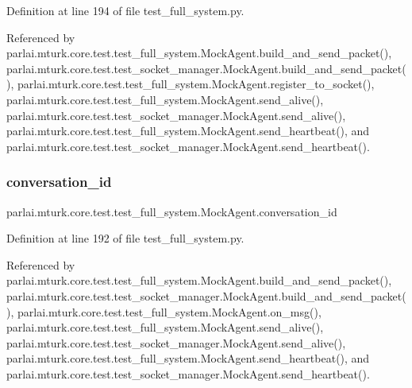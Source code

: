 Definition at line 194 of file test\+\_\+full\+\_\+system.\+py.



Referenced by parlai.\+mturk.\+core.\+test.\+test\+\_\+full\+\_\+system.\+Mock\+Agent.\+build\+\_\+and\+\_\+send\+\_\+packet(), parlai.\+mturk.\+core.\+test.\+test\+\_\+socket\+\_\+manager.\+Mock\+Agent.\+build\+\_\+and\+\_\+send\+\_\+packet(), parlai.\+mturk.\+core.\+test.\+test\+\_\+full\+\_\+system.\+Mock\+Agent.\+register\+\_\+to\+\_\+socket(), parlai.\+mturk.\+core.\+test.\+test\+\_\+full\+\_\+system.\+Mock\+Agent.\+send\+\_\+alive(), parlai.\+mturk.\+core.\+test.\+test\+\_\+socket\+\_\+manager.\+Mock\+Agent.\+send\+\_\+alive(), parlai.\+mturk.\+core.\+test.\+test\+\_\+full\+\_\+system.\+Mock\+Agent.\+send\+\_\+heartbeat(), and parlai.\+mturk.\+core.\+test.\+test\+\_\+socket\+\_\+manager.\+Mock\+Agent.\+send\+\_\+heartbeat().

\mbox{\label{classparlai_1_1mturk_1_1core_1_1test_1_1test__full__system_1_1MockAgent_a605ad989fece57d50544d825cfad726e}} 
\subsubsection{\texorpdfstring{conversation\+\_\+id}{conversation\_id}}
{\footnotesize\ttfamily parlai.\+mturk.\+core.\+test.\+test\+\_\+full\+\_\+system.\+Mock\+Agent.\+conversation\+\_\+id}



Definition at line 192 of file test\+\_\+full\+\_\+system.\+py.



Referenced by parlai.\+mturk.\+core.\+test.\+test\+\_\+full\+\_\+system.\+Mock\+Agent.\+build\+\_\+and\+\_\+send\+\_\+packet(), parlai.\+mturk.\+core.\+test.\+test\+\_\+socket\+\_\+manager.\+Mock\+Agent.\+build\+\_\+and\+\_\+send\+\_\+packet(), parlai.\+mturk.\+core.\+test.\+test\+\_\+full\+\_\+system.\+Mock\+Agent.\+on\+\_\+msg(), parlai.\+mturk.\+core.\+test.\+test\+\_\+full\+\_\+system.\+Mock\+Agent.\+send\+\_\+alive(), parlai.\+mturk.\+core.\+test.\+test\+\_\+socket\+\_\+manager.\+Mock\+Agent.\+send\+\_\+alive(), parlai.\+mturk.\+core.\+test.\+test\+\_\+full\+\_\+system.\+Mock\+Agent.\+send\+\_\+heartbeat(), and parlai.\+mturk.\+core.\+test.\+test\+\_\+socket\+\_\+manager.\+Mock\+Agent.\+send\+\_\+heartbeat().

